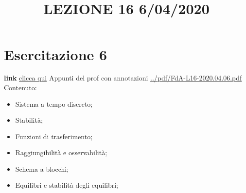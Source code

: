 \section{Esercitazione 6}
\title{LEZIONE 16 6/04/2020}\newline
\textbf{link} \href{https://web.microsoftstream.com/video/0384d9d2-5ddc-4381-8933-f46dc8fca4d3?list=user&userId=faa91214-a6f5-40d7-8875-253fd49b8ce1}{clicca qui}\newline
\newline
Appunti del prof con annotazioni \url{../pdf/FdA-L16-2020.04.06.pdf}\newline
Contenuto:
\begin{itemize}
    \item Sistema a tempo discreto;
    \item Stabilità;
    \item Funzioni di trasferimento;
    \item Raggiungibilità e osservabilità;
    \item Schema a blocchi;
    \item Equilibri e stabilità degli equilibri;
\end{itemize}